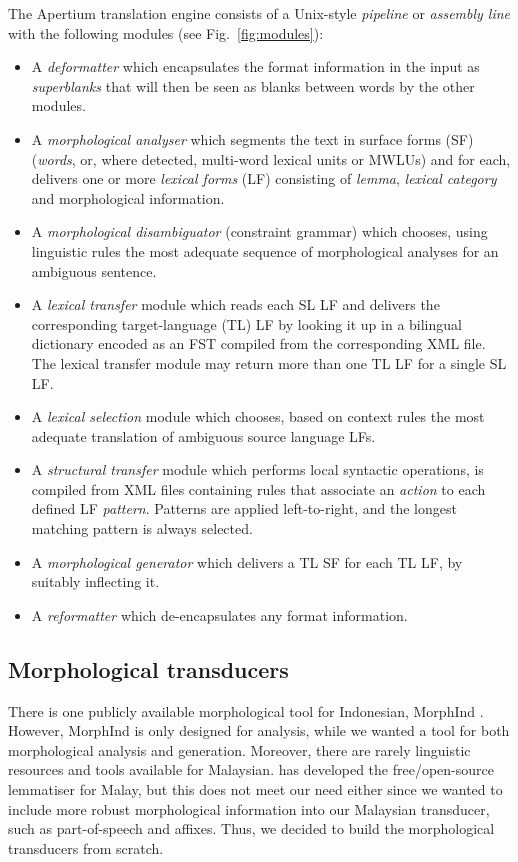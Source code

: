 \documentclass[10pt,a5paper,twoside]{article}
\begin{document}
The Apertium translation engine consists of a Unix-style \emph{pipeline} or
\emph{assembly line} with the following modules (see Fig.~\ref{fig:modules}):  
\begin{itemize}
\item A \emph{deformatter} which encapsulates the format information
 in the input as \emph{superblanks} that will then be seen
 as blanks between words by the other modules.
\item A \emph{morphological analyser} which segments the text in
  surface forms (SF) (\emph{words}, or, where detected, multi-word lexical
  units or MWLUs) and for each, delivers one or more \emph{lexical
    forms} (LF) consisting of \emph{lemma}, \emph{lexical category} and
  morphological information. 
\item A \emph{morphological disambiguator} (constraint grammar) which chooses, using linguistic rules
  the most adequate sequence of morphological analyses for an ambiguous sentence. 
\item A \emph{lexical transfer} module which reads each SL LF 
  and delivers the corresponding target-language (TL) LF
  by looking it up in a bilingual dictionary encoded as an FST
  compiled from the corresponding XML file. The lexical transfer module may
  return more than one TL LF for a single SL LF.
\item A \emph{lexical selection} module which chooses, based on context 
  rules the most adequate translation of ambiguous source language LFs.
\item A \emph{structural transfer} module which
    performs local syntactic operations, is compiled from XML files containing rules that 
    associate an \emph{action} to each defined LF \emph{pattern}. Patterns are applied left-to-right, and the 
    longest matching pattern is always selected.
\item A \emph{morphological generator} which delivers a TL SF
 for each TL LF, by suitably inflecting it. 
\item A \emph{reformatter} which de-encapsulates any format
  information.
\end{itemize}

\subsection{Morphological transducers}
There is one publicly available morphological tool for Indonesian, MorphInd \citep{larasati2011indonesian}. However, MorphInd is only designed for analysis, while we wanted a tool for both morphological analysis and generation. Moreover, there are rarely linguistic resources and tools available for Malaysian. \citet{Baldwin06opensource} has developed the free/open-source lemmatiser for Malay, but this does not meet our need either since we wanted to include more robust morphological information into our Malaysian transducer, such as part-of-speech and affixes. Thus, we decided to build the morphological transducers from scratch.
\end{document}
